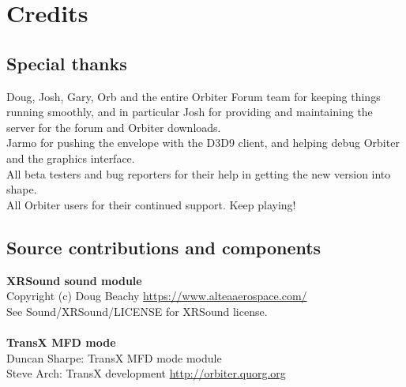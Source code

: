 \documentclass[Orbiter User Manual.tex]{subfiles}
\begin{document}
\section{Credits}

\subsection{Special thanks}
Doug, Josh, Gary, Orb and the entire Orbiter Forum team for keeping things running smoothly, and in particular Josh for providing and maintaining the server for the forum and Orbiter downloads.\\
Jarmo for pushing the envelope with the D3D9 client, and helping debug Orbiter and the graphics interface.\\
All beta testers and bug reporters for their help in getting the new version into shape.\\
All Orbiter users for their continued support. Keep playing!

\subsection{Source contributions and components}
\textbf{XRSound sound module}\\
Copyright (c) Doug Beachy \url{https://www.alteaaerospace.com/}\\
See Sound/XRSound/LICENSE for XRSound license.\\
\\
\textbf{TransX MFD mode}\\
Duncan Sharpe: TransX MFD mode module\\
Steve Arch: TransX development \url{http://orbiter.quorg.org}
\end{document}
